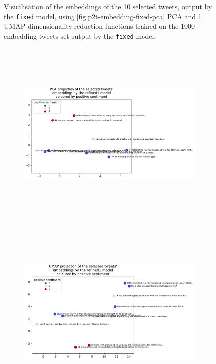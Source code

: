 \begin{figure}
\begin{subfigure}[t]{\textwidth}
        \caption{}\label{fig:p2t-embedding-fixed-umap}
    \end{subfigure}
    \caption{Visualisation of the embeddings of the 10 selected tweets, output by the \texttt{fixed} model, using \cref{fig:p2t-embedding-fixed-pca} PCA and \cref{fig:p2t-embedding-fixed-umap} UMAP dimensionality reduction functions trained on the 1000 embedding-tweets set output by the \texttt{fixed} model.}
    \label{fig:p2t-embedding-fixed}
\end{figure}
\begin{figure}
    \centering
    \begin{subfigure}[t]{\textwidth}
        \hspace*{1.5cm}\includegraphics[height=9cm]{images/transformer_embedding_refined1_pca_positive.pdf}
        \caption{}\label{fig:p2t-embedding-refined1-pca}
    \end{subfigure}
    \begin{subfigure}[t]{\textwidth}
        \hspace*{1.5cm}\includegraphics[height=9cm]{images/transformer_embedding_refined1_umap_positive.pdf}

\end{subfigure}
\end{figure}
